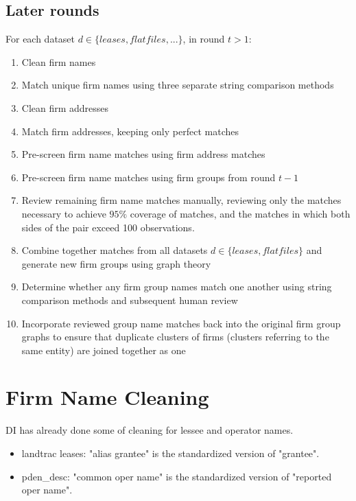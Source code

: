 \documentclass{article}
\begin{document}
\subsection{Later rounds}
For each dataset $d \in \{leases, flatfiles, ... \}$, in round $t > 1$:
\begin{enumerate}
    \item Clean firm names 
    
    \item Match unique firm names using three separate string comparison methods
    
    \item Clean firm addresses 
    
    \item Match firm addresses, keeping only perfect matches

    \item Pre-screen firm name matches using firm address matches
    
    \item Pre-screen firm name matches using firm groups from round $t - 1$
    
    \item Review remaining firm name matches manually, reviewing only the matches necessary to achieve $95\%$ coverage of matches, and the matches in which both sides of the pair exceed 100 observations. 
    
    \item Combine together matches from all datasets $d \in \{leases, flatfiles\}$ and generate new firm groups using graph theory
    
    \item Determine whether any firm group names match one another using string comparison methods and subsequent human review
    
    \item Incorporate reviewed group name matches back into the original firm group graphs to ensure that duplicate clusters of firms (clusters referring to the same entity) are joined together as one 
\end{enumerate}

\section{Firm Name Cleaning}

DI has already done some of cleaning for lessee and operator names.
\begin{itemize}
    \item landtrac leases: "alias grantee" is the standardized version of "grantee".
    \item pden\_desc: "common oper name" is the standardized version of "reported oper name".
\end{itemize}
\end{document}
